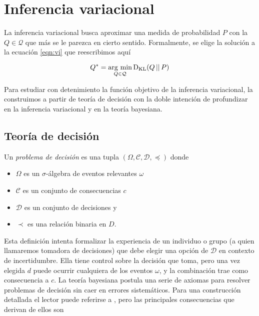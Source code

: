 \documentclass[main.tex]{subfiles}
\begin{document}
\chapter{Inferencia variacional}
La inferencia variacional busca aproximar una medida de probabilidad $P$ con la
$Q\in\mathcal{Q}$ que más se le parezca en cierto sentido. Formalmente, se elige
la solución a la ecuación \eqref{eqn:vi} que reescribimos aquí

\begin{equation*}
	Q^* = \operatorname*{arg\,\min}_{Q \in \mathcal{Q}} \operatorname*{D_{KL}}(Q\operatorname*{\mid\mid} P)
\end{equation*}

Para estudiar con detenimiento la función objetivo de la inferencia variacional,
la construimos a partir de teoría de decisión con la doble intención de
profundizar en la inferencia variacional y en la teoría bayesiana. 

\section{Teoría de decisión}
\begin{definition}
	Un \textit{problema de decisión} es una tupla $(\Omega, \mathcal{C},
	\mathcal{D}, \preceq)$ donde
	\begin{itemize}
		\item $\Omega$ es un $\sigma$-álgebra de eventos relevantes $\omega$
		\item $\mathcal{C}$ es un conjunto de consecuencias $c$
		\item $\mathcal{D}$ es un conjunto de decisiones y 
		\item $\prec$ es una relación binaria en $D$.
	\end{itemize}
\end{definition}
	
Esta definición intenta formalizar la experiencia de un individuo o grupo (a
quien llamaremos tomadora de decisiones) que debe elegir una opción de
$\mathcal{D}$ en contexto de incertidumbre. Ella tiene control sobre la decisión
que toma, pero una vez elegida $d$ puede ocurrir cualquiera de los eventos
$\omega$, y la combinación trae como consecuencia a $c$. La teoría bayesiana
postula una serie de axiomas para resolver problemas de decisión sin caer en
errores sistemáticos. Para una construcción detallada el lector puede referirse
a \cite{bernardo}, pero las principales consecuencias que derivan de ellos son
\end{document}
